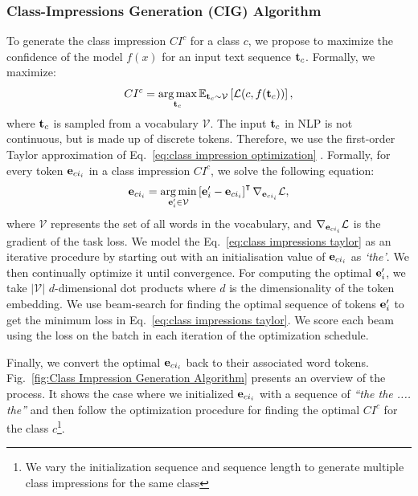 
\subsubsection{Class-Impressions Generation (CIG) Algorithm}
\label{sec:Class-Impressions Generation Algorithm}

To generate the class impression $CI^c$ for a class $c$, we propose to maximize the confidence of the model $f(x)$ for an input text sequence $\boldsymbol{\mathbf{t}}_c$. Formally, we maximize:
\begin{equation}
\label{eq:class impression optimization}
CI^c = \argmax_{\mb{t}_{c}} \mathbb{E}_{\mb{t}_{c} \sim \mathcal{V}}\left[\loss(c, f(\mb{t}_c)) \right],
\end{equation}
\noindent where $\boldsymbol{\mathbf{t}}_c$ is sampled from a vocabulary $\mathcal{V}$. The input $\boldsymbol{\mathbf{t}}_c$ in NLP is not continuous, but is made up of discrete tokens. Therefore, we use the first-order Taylor approximation of Eq.~\ref{eq:class impression optimization} \cite{michel2019evaluation,ebrahimi2017hotflip,wallace2019universal}. Formally, for every token $\boldsymbol{\mathbf{e}}_{ci_i}$ in a class impression $CI^c$, we solve the following equation: 
\begin{equation}\label{eq:class impressions taylor}
 \mb{e}_{ci_i} = \argmin_{\mb{e}_i^\prime \in \mathcal V}\left[\mb{e}_i^\prime-{\mb{e}_{ci_i}}\right]^\intercal\nabla_{\mb{e}_{ci_i}}\loss,
\end{equation}
\noindent where $\mathcal{V}$ represents the set of all words in the vocabulary, and $\nabla_{\boldsymbol{\mathbf{e}}_{ci_i}}\mathcal{L}$ is the gradient of the task loss. We model the Eq.~\ref{eq:class impressions taylor} as an iterative procedure by starting out with an initialisation value of $\boldsymbol{\mathbf{e}}_{ci_i}$ as \textit{`the'}. We then continually optimize it until convergence. For computing the optimal $\boldsymbol{\mathbf{e}}_i^\prime$, we take $\vert \mathcal V \vert$ $d$-dimensional dot products where $d$ is the dimensionality of the token embedding. We use beam-search for finding the optimal sequence of tokens $\boldsymbol{\mathbf{e}}_i^\prime$ to get the minimum loss in Eq.~\ref{eq:class impressions taylor}. We score each beam using the loss on the batch in each iteration of the optimization schedule.

Finally, we convert the optimal $\boldsymbol{\mathbf{e}}_{ci_i}$ back to their associated word tokens. Fig.~\ref{fig:Class Impression Generation Algorithm} presents an overview of the process. It shows the case where we initialized $\boldsymbol{\mathbf{e}}_{ci_i}$ with a sequence of \textit{``the the .... the''} and then follow the optimization procedure for finding the optimal $CI^c$ for the class $c$\footnote{We vary the initialization sequence and sequence length to generate multiple class impressions for the same class}.


